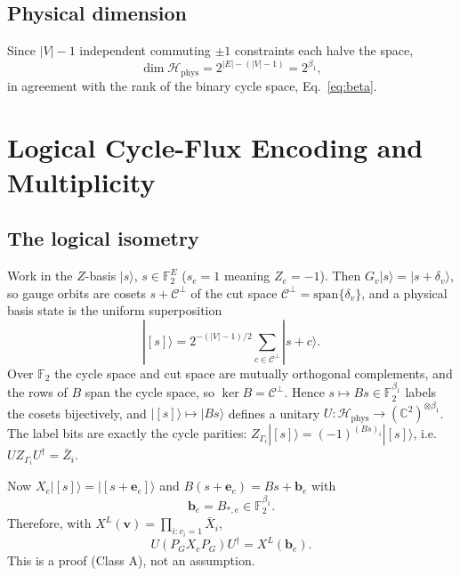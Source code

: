 \documentclass[10pt,twocolumn]{article}
\theoremstyle{definition}
\newcommand{\F}{\mathbb{F}_2}
\newcommand{\Hphys}{\mathcal{H}_{\mathrm{phys}}}
\newcommand{\PG}{P_G}
\newcommand{\XL}{X^{L}}
\begin{document}
\subsection{Physical dimension}
Since $|V|-1$ independent commuting $\pm1$ constraints each halve the space,
\begin{equation}
\dim\Hphys=2^{|E|-(|V|-1)}=2^{\beta_1}, \label{eq:dim}
\end{equation}
in agreement with the rank of the binary cycle space, Eq.~\eqref{eq:beta}.

\section{Logical Cycle-Flux Encoding and Multiplicity}
\subsection{The logical isometry}
Work in the $Z$-basis $|s\rangle$, $s\in\F^{E}$ ($s_e=1$ meaning $Z_e=-1$). Then $G_v|s\rangle=|s+\delta_v\rangle$, so gauge orbits are cosets $s+\mathcal C^\perp$ of the cut space $\mathcal C^\perp=\mathrm{span}\{\delta_v\}$, and a physical basis state is the uniform superposition
\[
|[s]\rangle=2^{-(|V|-1)/2}\sum_{c\in\mathcal C^\perp}|s+c\rangle .
\]
Over $\F$ the cycle space and cut space are mutually orthogonal complements, and the rows of $B$ span the cycle space, so $\ker B=\mathcal C^\perp$. Hence $s\mapsto Bs\in\F^{\beta_1}$ labels the cosets bijectively, and $|[s]\rangle\mapsto|Bs\rangle$ defines a unitary $U:\Hphys\to(\mathbb C^2)^{\otimes\beta_1}$. The label bits are exactly the cycle parities: $Z_{\Gamma_i}|[s]\rangle=(-1)^{(Bs)_i}|[s]\rangle$, i.e.\ $U Z_{\Gamma_i}U^\dagger=\bar Z_i$.

Now $X_e|[s]\rangle=|[s+\mathbf e_e]\rangle$ and $B(s+\mathbf e_e)=Bs+\mathbf b_e$ with
\begin{equation}
\mathbf b_e=B_{*,e}\in\F^{\beta_1}. \label{eq:be}
\end{equation}
Therefore, with $\XL(\mathbf v)=\prod_{i:v_i=1}\bar X_i$,
\begin{equation}
U(\PG X_e\PG)U^\dagger=\XL(\mathbf b_e). \label{eq:iso}
\end{equation}
This is a proof (Class A), not an assumption.
\end{document}
